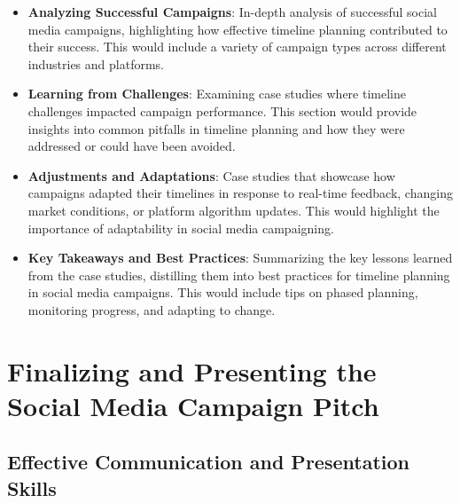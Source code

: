 \documentclass[
]{book}
\providecommand{\tightlist}{%
  \setlength{\itemsep}{0pt}\setlength{\parskip}{0pt}}
\begin{document}
\begin{itemize}
\tightlist
\item
  \textbf{Analyzing Successful Campaigns}: In-depth analysis of successful social media campaigns, highlighting how effective timeline planning contributed to their success. This would include a variety of campaign types across different industries and platforms.
\item
  \textbf{Learning from Challenges}: Examining case studies where timeline challenges impacted campaign performance. This section would provide insights into common pitfalls in timeline planning and how they were addressed or could have been avoided.
\item
  \textbf{Adjustments and Adaptations}: Case studies that showcase how campaigns adapted their timelines in response to real-time feedback, changing market conditions, or platform algorithm updates. This would highlight the importance of adaptability in social media campaigning.
\item
  \textbf{Key Takeaways and Best Practices}: Summarizing the key lessons learned from the case studies, distilling them into best practices for timeline planning in social media campaigns. This would include tips on phased planning, monitoring progress, and adapting to change.
\end{itemize}

\hypertarget{finalizing-and-presenting-the-social-media-campaign-pitch}{%
\chapter{Finalizing and Presenting the Social Media Campaign Pitch}\label{finalizing-and-presenting-the-social-media-campaign-pitch}}

\hypertarget{effective-communication-and-presentation-skills}{%
\section*{Effective Communication and Presentation Skills}\label{effective-communication-and-presentation-skills}}
\end{document}
